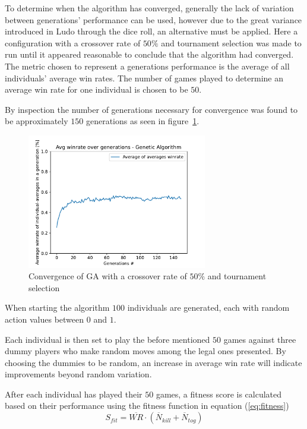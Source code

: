 To determine when the algorithm has converged, generally the lack of variation between generations' 
performance can be used, however due to the great variance introduced in Ludo through the dice roll, 
an alternative must be applied. Here a configuration with a crossover rate of $50\%$ and tournament 
selection was made to run until it appeared reasonable to conclude that the algorithm had converged.
The metric chosen to represent a generations performance is the average of all individuals' average
win rates. The number of games played to determine an average win rate for one individual is chosen to be $50$.\par
By inspection the number of generations necessary for convergence was found to be approximately $150$
generations as seen in figure~\ref{fig:convergence}.
\begin{figure}[h]
	\begin{center}
		\includegraphics[width=0.7\textwidth]{fig/img_cr_0.5_se_tournament.pdf}
	\end{center}
	\caption{Convergence of GA with a crossover rate of $50\%$ and tournament selection}
	\label{fig:convergence}
\end{figure}
When starting the algorithm $100$ individuals are generated, each with random action values between $0$ and $1$.\par
Each individual is then set to play the before mentioned $50$ games against three dummy players who make 
random moves among the legal
ones presented. By choosing the dummies to be random, an increase in average win rate will indicate 
improvements beyond random variation. \par 
After each individual has played their $50$ games, a fitness score is calculated based on their performance using 
the fitness function in equation (\ref{eq:fitness})
\begin{equation}
	S_{fit} = \overline{WR} \cdot \left( \overline{N}_{kill} + \overline{N}_{tog} \right)
	\label{eq:fitness}
\end{equation}
